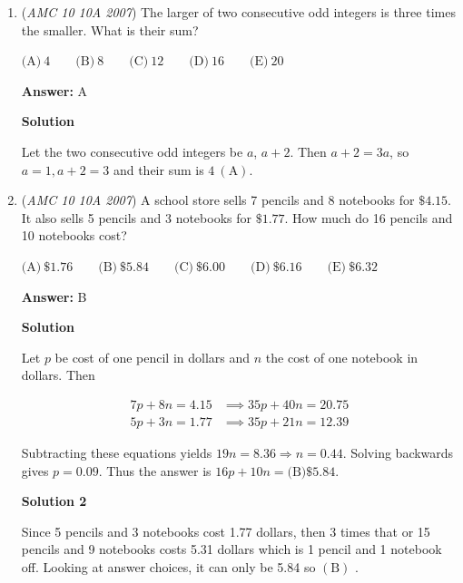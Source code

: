 \begin{enumerate}
\textbf{Solution}

The volume of the brick is $40 \times 20 \times 10 = 8000$. Thus the water volume rose $8000 = 100 \times 40 \times h \Longrightarrow h = 2\ \boxed{\mathrm{(D)}}$.

 


	\item (\textit{AMC 10 10A 2007}) The larger of two consecutive odd integers is three times the smaller. What is their sum?


 $\text{(A)}\ 4 \qquad \text{(B)}\ 8 \qquad \text{(C)}\ 12 \qquad \text{(D)}\ 16 \qquad \text{(E)}\ 20$

 \textbf{Answer: }A



\textbf{Solution}

Let the two consecutive odd integers be $a$, $a+2$. Then $a+2 = 3a$, so $a = 1, a + 2 = 3$ and their sum is $4\ \boxed{\mathrm{(A)}}$.

 


	\item (\textit{AMC 10 10A 2007}) A school store sells 7 pencils and 8 notebooks for $\$4.15$. It also sells 5 pencils and 3 notebooks for $\$1.77$. How much do 16 pencils and 10 notebooks cost?


 $\text{(A)}\ \$1.76 \qquad \text{(B)}\ \$5.84 \qquad \text{(C)}\ \$6.00 \qquad \text{(D)}\ \$6.16 \qquad \text{(E)}\ \$6.32$

 \textbf{Answer: }B



\textbf{Solution}

Let $p$ be cost of one pencil in dollars and $n$ the cost of one notebook in dollars. Then

 
 \begin{align*} 7p + 8n = 4.15 &\implies  35p + 40n = 20.75\\ 5p + 3n = 1.77 &\implies  35p + 21n = 12.39 \end{align*}


 Subtracting these equations yields $19n = 8.36 \Longrightarrow n = 0.44$. Solving backwards gives $p = 0.09$. Thus the answer is $16p + 10n = \text{(B)}\mathdollar 5.84$.

 



\textbf{Solution 2}

Since 5 pencils and 3 notebooks cost 1.77 dollars, then 3 times that or 15 pencils and 9 notebooks costs 5.31 dollars which is 1 pencil and 1 notebook off. Looking at answer choices, it can only be 5.84 so $\mathrm{(B)}$ .


\end{enumerate}
